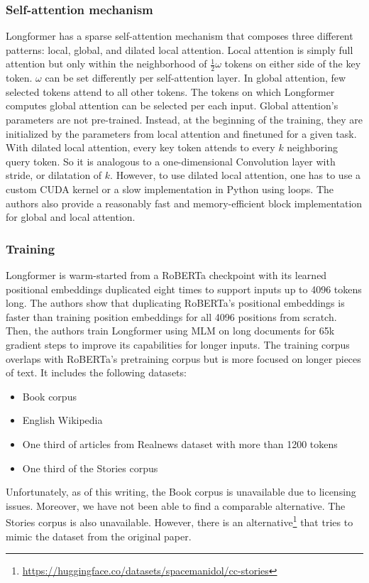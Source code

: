 \subsubsection{Self-attention mechanism}

Longformer has a sparse self-attention mechanism that composes three different
patterns: local, global, and dilated local attention. Local attention is simply
full attention but only within the neighborhood of $\frac{1}{2}\omega$ tokens
on either side of the key token. $\omega$ can be set differently per
self-attention layer. In global attention, few selected tokens attend to all
other tokens. The tokens on which Longformer computes global attention can be
selected per each input. Global attention's parameters are not pre-trained.
Instead, at the beginning of the training, they are initialized by the
parameters from local attention and finetuned for a given task. With dilated
local attention, every key token attends to every $k$ neighboring query token.
So it is analogous to a one-dimensional Convolution layer
\citep{van2016wavenet} with stride, or dilatation of $k$. However, to use
dilated local attention, one has to use a custom CUDA kernel or a slow
implementation in Python using loops. The authors also provide a reasonably
fast and memory-efficient block implementation for global and local
attention.

\subsubsection{Training}

Longformer is warm-started from a RoBERTa \citep{liu2019roberta} checkpoint
with its learned positional embeddings duplicated eight times to support inputs
up to 4096 tokens long. The authors show that duplicating RoBERTa's positional
embeddings is faster than training position embeddings for all 4096 positions
from scratch. Then, the authors train Longformer using MLM on long documents
for 65k gradient steps to improve its capabilities for longer inputs. The
training corpus overlaps with RoBERTa's pretraining corpus but is more focused
on longer pieces of text. It includes the following datasets:

\begin{itemize}

  \item Book corpus \citep{zhu2015aligning}

  \item English Wikipedia

  \item One third of articles from Realnews dataset \citep{zellers2019defending}
      with more than 1200 tokens

  \item One third of the Stories corpus \citep{trinh2018simple}

\end{itemize}

Unfortunately, as of this writing, the Book corpus is unavailable due to
licensing issues. Moreover, we have not been able to find a comparable
alternative. The Stories corpus is also unavailable. However, there is an
alternative\footnote{\url{https://huggingface.co/datasets/spacemanidol/cc-stories}}
that tries to mimic the dataset from the original paper.
